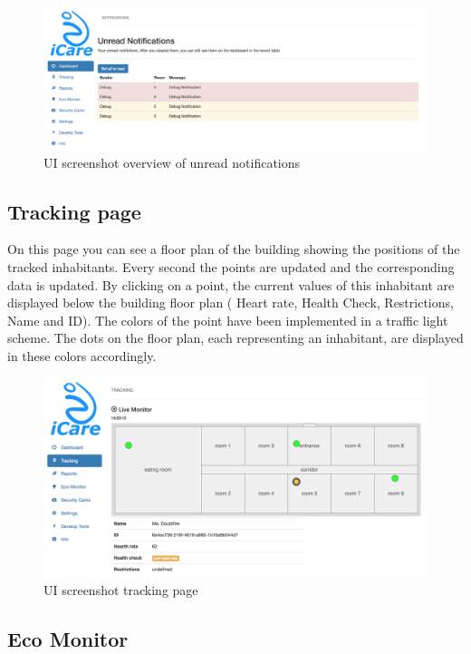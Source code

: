 \begin{figure}[H]
	\centering
	\includegraphics[width =1\textwidth]{images/uiUnreadNotifications.png}
	\caption{UI screenshot overview of unread notifications}
\end{figure}

\subsection{Tracking page}
On this page you can see a floor plan of the building showing the positions of the tracked inhabitants.
Every second the points are updated and the corresponding data is updated.
By clicking on a point, the current values of this inhabitant are displayed below the building floor plan ( Heart rate, Health Check, Restrictions, Name and ID).
The colors of the point have been implemented in a traffic light scheme. The dots on the floor plan, each representing an inhabitant, are displayed in these colors accordingly.


\begin{figure}[H]
	\centering
	\includegraphics[width =1\textwidth]{images/uiTracking2.png}
	\caption{UI screenshot tracking page}
\end{figure}


\subsection{Eco Monitor}

